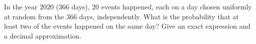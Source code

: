 In the year $2020$ ($366$ days), $20$ events happened, each on a day chosen uniformly at random from the $366$ days, independently. What is the probability that at least two of the events happened on the same day? Give an exact expression and a decimal approximation.

